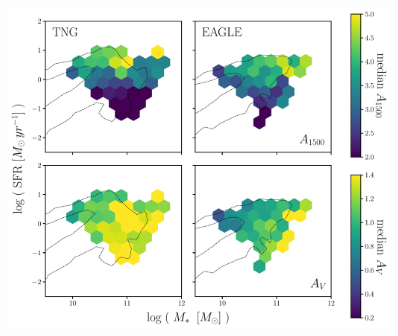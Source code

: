 
\begin{figure}
\begin{center}
    \includegraphics[width=0.9\textwidth]{figs/abc_av_mssfr.pdf}
    \caption{\label{fig:avmsfr}
    }
\end{center}
\end{figure}

